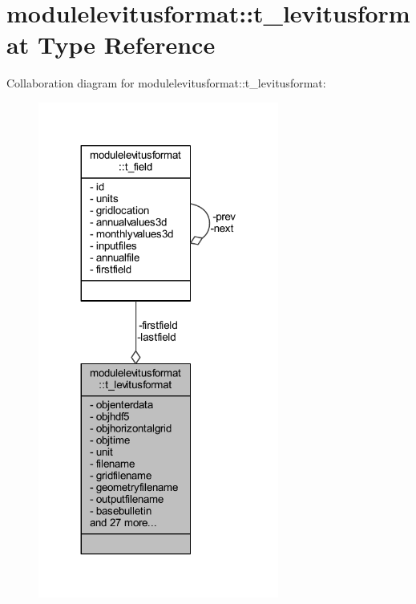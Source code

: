 \hypertarget{structmodulelevitusformat_1_1t__levitusformat}{}\section{modulelevitusformat\+:\+:t\+\_\+levitusformat Type Reference}
\label{structmodulelevitusformat_1_1t__levitusformat}


Collaboration diagram for modulelevitusformat\+:\+:t\+\_\+levitusformat\+:\nopagebreak
\begin{figure}[H]
\begin{center}
\leavevmode
\includegraphics[width=224pt]{structmodulelevitusformat_1_1t__levitusformat__coll__graph}
\end{center}
\end{figure}
